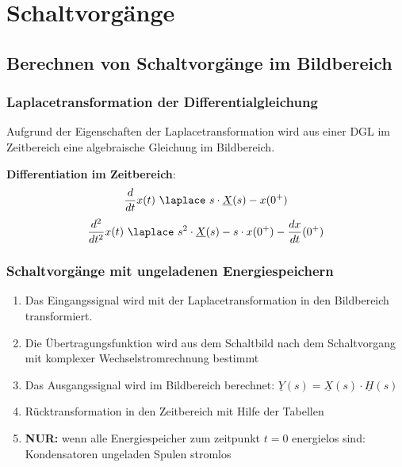 \section{Schaltvorgänge}
\subsection{Berechnen von Schaltvorgänge im Bildbereich}
\subsubsection{Laplacetransformation der Differentialgleichung}
Aufgrund der Eigenschaften der Laplacetransformation wird aus einer
DGL im Zeitbereich eine algebraische Gleichung im Bildbereich.

\textbf{Differentiation im Zeitbereich}:
\[
	\frac{d}{dt}x(t) \ \laplace\ s\cdot\underline{X}(s)-x(0^+)
\]
\[
	\frac{d^2}{dt^2}x(t) \ \laplace\ s^2\cdot\underline{X}(s)-s\cdot x(0^+)-\frac{dx}{dt}(0^+)
\]

\newpage
\subsubsection{Schaltvorgänge mit ungeladenen Energiespeichern}
\begin{enumerate}
	\item Das Eingangssignal wird mit der Laplacetransformation in den
	      Bildbereich transformiert.
    \item Die Übertragungsfunktion wird aus dem Schaltbild nach dem
        Schaltvorgang mit komplexer Wechselstromrechnung bestimmt
    \item Das Ausgangssignal wird im Bildbereich berechnet: $\underline{Y}(s) =
        \underline{X}(s)\cdot \underline{H}(s)$
    \item Rücktransformation in den Zeitbereich mit Hilfe der Tabellen
    \item \textbf{NUR:} wenn alle Energiespeicher zum zeitpunkt $t=0$
        energielos sind:
        \subitem[i] Kondensatoren ungeladen
        \subitem[ii] Spulen stromlos
\end{enumerate}
